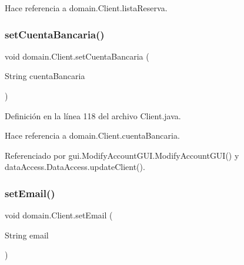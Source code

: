 Hace referencia a domain.\+Client.\+lista\+Reserva.

\mbox{\label{classdomain_1_1_client_a02858d702a1b74589412777da82111ca}} 
\subsubsection{\texorpdfstring{setCuentaBancaria()}{setCuentaBancaria()}}
{\footnotesize\ttfamily void domain.\+Client.\+set\+Cuenta\+Bancaria (\begin{DoxyParamCaption}\item[{String}]{cuenta\+Bancaria }\end{DoxyParamCaption})}



Definición en la línea 118 del archivo Client.\+java.


\begin{DoxyCode}{0}

\end{DoxyCode}


Hace referencia a domain.\+Client.\+cuenta\+Bancaria.



Referenciado por gui.\+Modify\+Account\+G\+U\+I.\+Modify\+Account\+G\+U\+I() y data\+Access.\+Data\+Access.\+update\+Client().

\mbox{\label{classdomain_1_1_client_a525e1e3b7447d73947fa880f4c836872}} 
\subsubsection{\texorpdfstring{setEmail()}{setEmail()}}
{\footnotesize\ttfamily void domain.\+Client.\+set\+Email (\begin{DoxyParamCaption}\item[{String}]{email }\end{DoxyParamCaption})}




